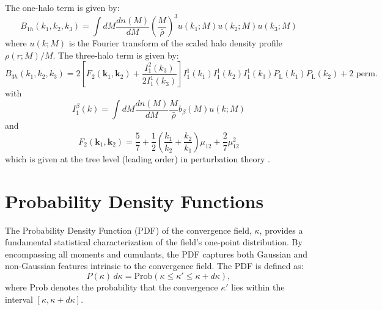 The one-halo term is given by:
\begin{equation}
    B_{1h}\left(k_1, k_2, k_3\right)=\int d M \frac{d n(M)}{d M}\left(\frac{M}{\bar{\rho}}\right)^3 u\left(k_1 ; M\right) u\left(k_2 ; M\right) u\left(k_3 ; M\right)
    \label{eq:bihalofit_1h}
\end{equation}
where \( u(k; M) \) is the Fourier transform of the scaled halo density profile $\rho(r; M)/M$. The three-halo term is given by:
\begin{equation}
    B_{3h}\left(k_1, k_2, k_3\right)=2\left[F_2\left(\boldsymbol{k}_1, \boldsymbol{k}_2\right)+\frac{I_1^2\left(k_3\right)}{2 I_1^1\left(k_3\right)}\right] I_1^1\left(k_1\right) I_1^1\left(k_2\right) I_1^1\left(k_3\right) P_{\mathrm{L}}\left(k_1\right) P_{\mathrm{L}}\left(k_2\right)+2 \text { perm. }
    \label{eq:bihalofit_3h}
\end{equation}
with 
\begin{equation}
    I_1^\beta(k)=\int d M \frac{d n(M)}{d M} \frac{M}{\bar{\rho}} b_\beta(M) u(k ; M)
    \label{eq:bihalofit_3h_integral}
\end{equation}
and
\begin{equation}
    F_2\left(\boldsymbol{k}_1, \boldsymbol{k}_2\right)=\frac{5}{7}+\frac{1}{2}\left(\frac{k_1}{k_2}+\frac{k_2}{k_1}\right) \mu_{12}+\frac{2}{7} \mu_{12}^2
    \label{eq:bihalofit_3h_F2}
\end{equation}
which is given at the tree level (leading order) in perturbation theory \citep{2002PhR...367....1B}.

\section{Probability Density Functions} \label{sec:pdfs}
The Probability Density Function (PDF) of the convergence field, $\kappa$, provides a fundamental statistical characterization of the field's one-point distribution. By encompassing all moments and cumulants, the PDF captures both Gaussian and non-Gaussian features intrinsic to the convergence field. The PDF is defined as:
\begin{equation}
    P(\kappa) \, d\kappa = \mathrm{Prob}(\kappa \leq \kappa' \leq \kappa + d\kappa),
\end{equation}
where \(\mathrm{Prob}\) denotes the probability that the convergence \(\kappa'\) lies within the interval \([\kappa, \kappa + d\kappa]\).

